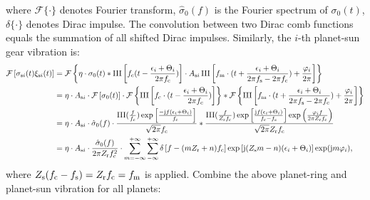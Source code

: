 \documentclass[a4paper,fleqn]{cas-sc}%
\begin{document}
where $\mathcal{F}\{\cdot\}$ denotes Fourier transform, $\hat{\sigma}_0(f)$ is the Fourier spectrum of $\sigma_0(t)$, $\delta\{\cdot\}$ denotes Dirac impulse. The convolution between two Dirac comb functions equals the summation of all shifted Dirac impulses. Similarly,  the $i$-th planet-sun gear vibration is:
\begin{equation}
    \begin{split}
        \mathcal{F}\left[\sigma_{{\rm s}i}(t) \xi_{{\rm s}i}(t)\right]&=\mathcal{F}\left\{ \eta \cdot \sigma_0(t) \ast \operatorname{III}\left[f_{\rm c}(t-\frac{\epsilon_i+\Theta_i}{2 \pi f_{\rm c}})\right] \cdot A_{{\rm s}i} \operatorname{III} \left[ f_{\rm m} \cdot (t+ \frac{\epsilon_i+\Theta_i}{2\pi f_{\rm s} -2\pi f_{\rm c}} ) +\frac{\varphi_i}{2\pi} \right] \right\}\\
        &=\eta \cdot A_{{\rm s}i} \cdot \mathcal{F}\left[\sigma_0(t)\right] \cdot \mathcal{F}\left\{ \operatorname{III}\left[f_{\rm c} \cdot (t-\frac{\epsilon_i+\Theta_i}{2\pi f_{\rm c}}) \right] \right\} \ast \mathcal{F}\left\{\operatorname{III} \left[ f_{\rm m} \cdot (t+ \frac{\epsilon_i+\Theta_i}{2\pi f_{\rm s} -2\pi f_{\rm c}} ) +\frac{\varphi_i}{2\pi} \right]\right\}\\
        &=\eta \cdot A_{{\rm s}i} \cdot \hat{\sigma}_0(f) \cdot \frac{\operatorname{III}(\frac{f}{f_{\rm c}}) \exp\left[\frac{-{\rm j}f(\epsilon_i+\Theta_i)}{f_{\rm c}}\right]}{\sqrt{2 \pi} f_{\rm c}} \ast \frac{\operatorname{III}(\frac{f}{Z_{\rm r}f_{\rm c}})\exp\left[\frac{{\rm j}f(\epsilon_i+\Theta_i)}{f_{\rm c}-f_{\rm s}}\right] \exp\left(\frac{\varphi_i f}{2\pi Z_{\rm r} f_{\rm c} } \right)}{\sqrt{2 \pi }Z_{\rm r} f_{\rm c}}\\
        &=\eta \cdot A_{{\rm s}i} \cdot \frac{\hat{\sigma}_0(f)}{2 \pi  Z_{\rm r} f_{\rm c}^2} \cdot \sum_{m=-\infty}^{+\infty} \sum_{-\infty}^{+\infty} \delta\left[f-(m Z_{\rm r}+ n)f_{\rm c} \right] \exp\left[ {\rm j} (Z_{\rm s} m - n)(\epsilon_i+\Theta_i) \right] \exp({\rm j}m \varphi_i),
    \end{split}
\end{equation}
where $Z_{\rm s}  (f_{\rm c} -f_{\rm s})= Z_{\rm r} f_{\rm c} =f_{\rm m}$ is applied. Combine the above planet-ring and planet-sun vibration for all planets:
\end{document}
